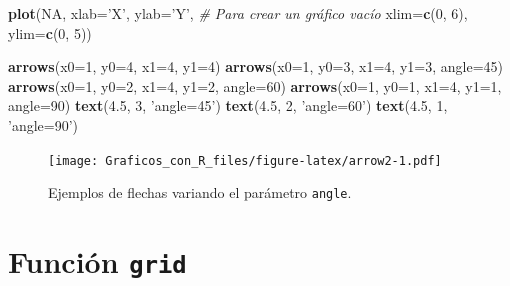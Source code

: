 \documentclass[10pt,]{krantz}
\makeatletter
\newenvironment{Shaded}{\begin{snugshade}}{\end{snugshade}}
\newcommand{\KeywordTok}[1]{\textcolor[rgb]{0.13,0.29,0.53}{\textbf{#1}}}
\newcommand{\DataTypeTok}[1]{\textcolor[rgb]{0.13,0.29,0.53}{#1}}
\newcommand{\DecValTok}[1]{\textcolor[rgb]{0.00,0.00,0.81}{#1}}
\newcommand{\FloatTok}[1]{\textcolor[rgb]{0.00,0.00,0.81}{#1}}
\newcommand{\StringTok}[1]{\textcolor[rgb]{0.31,0.60,0.02}{#1}}
\newcommand{\CommentTok}[1]{\textcolor[rgb]{0.56,0.35,0.01}{\textit{#1}}}
\newcommand{\OtherTok}[1]{\textcolor[rgb]{0.56,0.35,0.01}{#1}}
\newcommand{\NormalTok}[1]{#1}
\newenvironment{kframe}{%
\medskip{}
\setlength{\fboxsep}{.8em}
 \def\at@end@of@kframe{}%
 \ifinner\ifhmode%
  \def\at@end@of@kframe{\end{minipage}}%
  \begin{minipage}{\columnwidth}%
 \fi\fi%
 \def\FrameCommand##1{\hskip\@totalleftmargin \hskip-\fboxsep
 \colorbox{shadecolor}{##1}\hskip-\fboxsep
     \hskip-\linewidth \hskip-\@totalleftmargin \hskip\columnwidth}%
 \MakeFramed {\advance\hsize-\width
   \@totalleftmargin\z@ \linewidth\hsize
   \@setminipage}}%
 {\par\unskip\endMakeFramed%
 \at@end@of@kframe}
\renewenvironment{Shaded}{\begin{kframe}}{\end{kframe}}
\makeatother
\begin{document}
\begin{Shaded}
\begin{Highlighting}[]
\KeywordTok{plot}\NormalTok{(}\OtherTok{NA}\NormalTok{, }\DataTypeTok{xlab=}\StringTok{'X'}\NormalTok{, }\DataTypeTok{ylab=}\StringTok{'Y'}\NormalTok{,      }\CommentTok{# Para crear un gráfico vacío}
     \DataTypeTok{xlim=}\KeywordTok{c}\NormalTok{(}\DecValTok{0}\NormalTok{, }\DecValTok{6}\NormalTok{), }\DataTypeTok{ylim=}\KeywordTok{c}\NormalTok{(}\DecValTok{0}\NormalTok{, }\DecValTok{5}\NormalTok{))}

\KeywordTok{arrows}\NormalTok{(}\DataTypeTok{x0=}\DecValTok{1}\NormalTok{, }\DataTypeTok{y0=}\DecValTok{4}\NormalTok{, }\DataTypeTok{x1=}\DecValTok{4}\NormalTok{, }\DataTypeTok{y1=}\DecValTok{4}\NormalTok{)}
\KeywordTok{arrows}\NormalTok{(}\DataTypeTok{x0=}\DecValTok{1}\NormalTok{, }\DataTypeTok{y0=}\DecValTok{3}\NormalTok{, }\DataTypeTok{x1=}\DecValTok{4}\NormalTok{, }\DataTypeTok{y1=}\DecValTok{3}\NormalTok{, }\DataTypeTok{angle=}\DecValTok{45}\NormalTok{)}
\KeywordTok{arrows}\NormalTok{(}\DataTypeTok{x0=}\DecValTok{1}\NormalTok{, }\DataTypeTok{y0=}\DecValTok{2}\NormalTok{, }\DataTypeTok{x1=}\DecValTok{4}\NormalTok{, }\DataTypeTok{y1=}\DecValTok{2}\NormalTok{, }\DataTypeTok{angle=}\DecValTok{60}\NormalTok{)}
\KeywordTok{arrows}\NormalTok{(}\DataTypeTok{x0=}\DecValTok{1}\NormalTok{, }\DataTypeTok{y0=}\DecValTok{1}\NormalTok{, }\DataTypeTok{x1=}\DecValTok{4}\NormalTok{, }\DataTypeTok{y1=}\DecValTok{1}\NormalTok{, }\DataTypeTok{angle=}\DecValTok{90}\NormalTok{)}
\KeywordTok{text}\NormalTok{(}\FloatTok{4.5}\NormalTok{, }\DecValTok{3}\NormalTok{, }\StringTok{'angle=45'}\NormalTok{)}
\KeywordTok{text}\NormalTok{(}\FloatTok{4.5}\NormalTok{, }\DecValTok{2}\NormalTok{, }\StringTok{'angle=60'}\NormalTok{)}
\KeywordTok{text}\NormalTok{(}\FloatTok{4.5}\NormalTok{, }\DecValTok{1}\NormalTok{, }\StringTok{'angle=90'}\NormalTok{)}
\end{Highlighting}
\end{Shaded}

\begin{figure}
\centering
\texttt{[image: Graficos\_con\_R\_files/figure-latex/arrow2-1.pdf]}
\caption{\label{fig:arrow2}Ejemplos de flechas variando el parámetro
\texttt{angle}.}
\end{figure}

\section{\texorpdfstring{Función \texttt{grid} 
\label{grid}}{Función grid  }}\label{funcion-grid}
\end{document}
